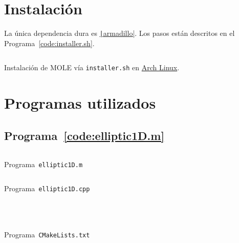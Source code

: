 \section{Instalación}

La única dependencia dura es
\href{https://arma.sourceforge.net/docs.html}{\texttt|armadillo|}.
Los pasos están descritos en el Programa~\ref{code:installer.sh}.

\begin{listing}[ht!]
    \tiny
    \centering
    \inputminted[frame=single,framesep=10pt,linenos,firstline=1,lastline=18,highlightlines={9,15}]{bash}{installer.sh}
    \caption{Instalación de MOLE vía \texttt{installer.sh} en \href{https://archlinux.org}{Arch Linux}.}
    \label{code:installer.sh}
\end{listing}

\section{Programas utilizados}

\subsection{Programa~\ref{code:elliptic1D.m}}

\begin{listing}[ht!]
    \tiny
    \centering
    \inputminted[frame=single,framesep=10pt,linenos,firstline=1,lastline=53,highlightlines={21,29}]{octave}{../examples/octave/elliptic1D.m}
    \caption{Programa~\texttt{elliptic1D.m}}
    \label{code:elliptic1D.m}
\end{listing}

\begin{listing}[ht!]
    \tiny
    \centering
    \inputminted[frame=single,framesep=10pt,linenos,firstline=1,lastline=80,highlightlines={24,27}]{cpp}{../examples/cpp/elliptic1D.cpp}
    \caption{Programa~\texttt{elliptic1D.cpp}}
    \label{code:elliptic1D.cpp}
\end{listing}

\begin{listing}[ht!]
    \tiny
    \centering
    \inputminted[firstline=1,lastline=8,highlightlines={7}]{cmake}{../examples/cpp/CMakeLists.txt}
    \inputminted[firstline=14,lastline=14]{cmake}{../examples/cpp/CMakeLists.txt}
    \inputminted[firstline=16,lastline=16,highlightlines={16}]{cmake}{../examples/cpp/CMakeLists.txt}
    \inputminted[firstline=65,lastline=69]{cmake}{../examples/cpp/CMakeLists.txt}
    \caption{Programa~\texttt{CMakeLists.txt}}
    \label{code:CMakeLists.txt}
\end{listing}

